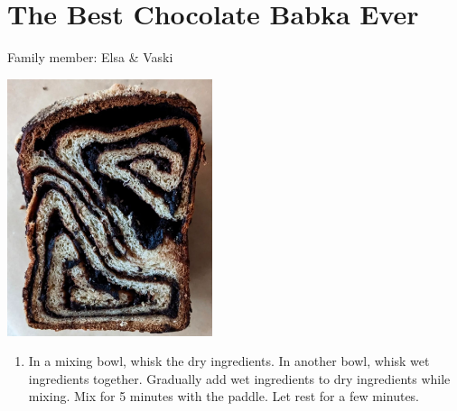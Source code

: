 \chapter{The Best Chocolate Babka Ever}
\label{ch:babka}

Family member: Elsa \& Vaski


\begin{marginfigure}[20pt]
  \includegraphics[width=60mm]{velsa/images/Babka.png}
  \label{fig:fig}
\end{marginfigure}

\begin{enumerate}
    \item  In a mixing bowl, whisk the dry ingredients. In another bowl, whisk wet ingredients together. Gradually add wet ingredients to dry ingredients while mixing. Mix for 5 minutes with the paddle. Let rest for a few minutes.

\end{enumerate}

